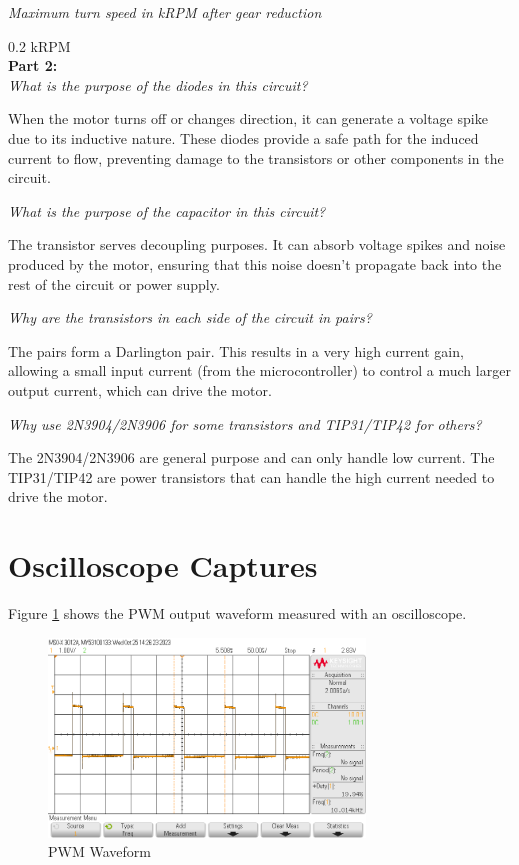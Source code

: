 \documentclass[CMPE]{KGCOEReport}
\begin{document}
\emph{Maximum turn speed in kRPM after gear reduction}

0.2 kRPM\\


\textbf{Part 2:}\\

\emph{What is the purpose of the diodes in this circuit?}

When the motor turns off or changes direction, it can generate a voltage spike due to its inductive nature. These diodes provide a safe path for the induced current to flow, preventing damage to the transistors or other components in the circuit.
\bigskip

\emph{What is the purpose of the capacitor in this circuit?}

The transistor serves decoupling purposes. It can absorb voltage spikes and noise produced by the motor, ensuring that this noise doesn't propagate back into the rest of the circuit or power supply.
\bigskip

\emph{Why are the transistors in each side of the circuit in pairs?}

The pairs form a Darlington pair. This results in a very high current gain, allowing a small input current (from the microcontroller) to control a much larger output current, which can drive the motor.
\bigskip

\emph{Why use 2N3904/2N3906 for some transistors and TIP31/TIP42 for others?}

The 2N3904/2N3906 are general purpose and can only handle low current. The TIP31/TIP42 are power transistors that can handle the high current needed to drive the motor.

\section*{Oscilloscope Captures}

Figure \ref{fig:pwm} shows the PWM output waveform measured with an oscilloscope.

\begin{figure}[H]
    \centering
    \includegraphics[width=0.75\textwidth]{PWM.png}
    \caption{PWM Waveform}
    \label{fig:pwm}
\end{figure}
\end{document}
